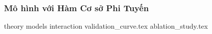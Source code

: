 \subsubsection{Mô hình với Hàm Cơ sở Phi Tuyến}

{theory}
{models}
{interaction}
{validation_curve.tex}
{ablation_study.tex}
